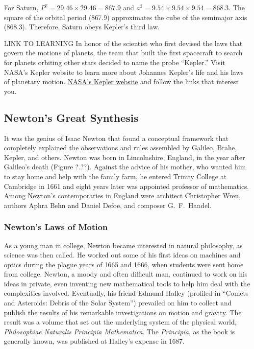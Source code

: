 \documentclass[../../main-astronomy.tex]{subfiles}
\begin{document}
\Solution For Saturn, $P^2 = 29.46 \times 29.46 = 867.9$ and $a^3 = 9.54 \times 9.54 \times 9.54 = 868.3$. The square of the orbital period (867.9) approximates the cube of the semimajor axis (868.3). Therefore, Saturn obeys Kepler's third law.

\endsolution

\begin{gradient}{LINK TO LEARNING}
    In honor of the scientist who first devised the laws that govern the motions of planets, the team that built the first spacecraft to search for planets orbiting other stars decided to name the probe ``Kepler.'' Visit NASA's Kepler website to learn more about Johannes Kepler's life and his laws of planetary motion. \href{https://openstax.org/l/30nasakepmiss}{NASA's Kepler website} and follow the links that interest you.
\end{gradient}

\subsection{Newton's Great Synthesis}

It was the genius of Isaac Newton that found a conceptual framework that completely explained the observations and rules assembled by Galileo, Brahe, Kepler, and others. Newton was born in Lincolnshire, England, in the year after Galileo's death (Figure ?.??). Against the advice of his mother, who wanted him to stay home and help with the family farm, he entered Trinity College at Cambridge in 1661 and eight years later was appointed professor of mathematics. Among Newton's contemporaries in England were architect Christopher Wren, authors Aphra Behn and Daniel Defoe, and composer G.~F.~Handel.

\vspace{1em} %

\subsubsection*{Newton's Laws of Motion}

As a young man in college, Newton became interested in natural philosophy, as science was then called. He worked out some of his first ideas on machines and optics during the plague years of 1665 and 1666, when students were sent home from college. Newton, a moody and often difficult man, continued to work on his ideas in private, even inventing new mathematical tools to help him deal with the complexities involved. Eventually, his friend Edmund Halley (profiled in ``Comets and Asteroids: Debris of the Solar System'') prevailed on him to collect and publish the results of his remarkable investigations on motion and gravity. The result was a volume that set out the underlying system of the physical world, \textit{Philosophiae Naturalis Principia Mathematica}. The \textit{Principia}, as the book is generally known, was published at Halley's expense in 1687.
\end{document}
